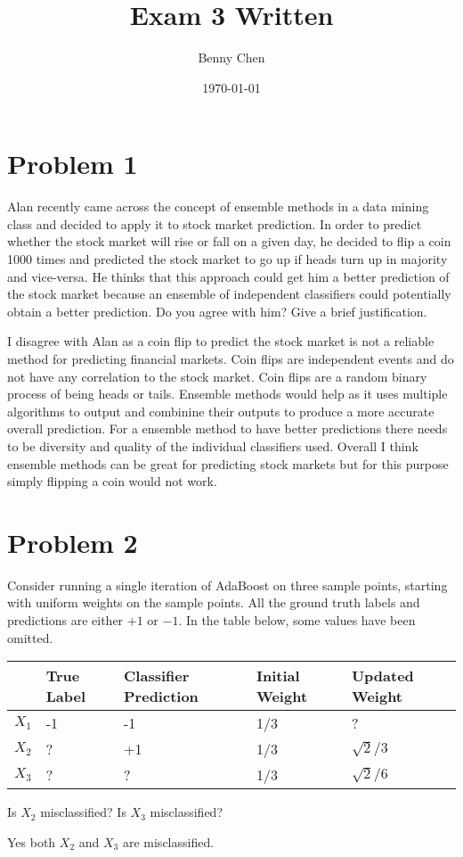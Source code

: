 \documentclass{article}
\title{Exam 3 Written}
\author{Benny Chen}
\date{\today}
\begin{document}
\maketitle

\section*{Problem 1}

Alan recently came across the concept of ensemble methods in a data mining class and decided to apply it to stock market prediction. In order to predict whether the stock market will rise or fall on a given day, he decided to flip a coin 1000 times and predicted the stock market to go up if heads turn up in majority and vice-versa. He thinks that this approach could get him a better prediction of the stock market because an ensemble of independent classifiers could potentially obtain a better prediction. Do you agree with him?
Give a brief justification.

I disagree with Alan as a coin flip to predict the stock market is not a reliable method for predicting financial markets. Coin flips are independent events and do not have any correlation to the stock market. Coin flips are a random binary process of being heads or tails. Ensemble methods would help as it uses multiple algorithms to output and combinine their outputs to produce a more accurate overall prediction. For a ensemble method to have better predictions there needs to be diversity and quality of the individual classifiers used. Overall I think ensemble methods can be great for predicting stock markets but for this purpose simply flipping a coin would not work.

\section*{Problem 2}

Consider running a single iteration of AdaBoost on three sample points, starting with uniform weights on the sample points. All the ground truth labels and predictions are either $+1$ or $-1$. In the table below, some values have been omitted.

\begin{table}[h]
    \begin{tabular}{lllll}
    \hline
          & True Label & Classifier Prediction & Initial Weight & Updated Weight \\ \hline
    $X_1$ & -1         & -1                    & 1/3            & ?              \\
    $X_2$ & ?          & +1                    & 1/3            & $\sqrt2/3$    \\
    $X_3$ & ?          & ?                     & 1/3            & $\sqrt2/6$    \\ \hline
    \end{tabular}
    \centering
\end{table}

Is $X_2$ misclassified? Is $X_3$ misclassified?

Yes both $X_2$ and $X_3$ are misclassified. 
\end{document}
